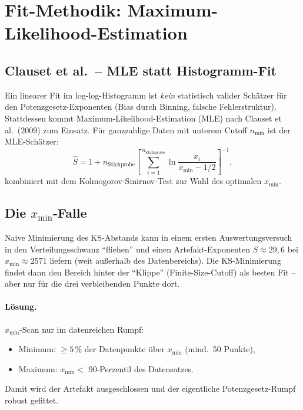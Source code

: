 \documentclass[11pt,a4paper]{article}
\begin{document}
\FloatBarrier
\section{Fit-Methodik: Maximum-Likelihood-Estimation}
\label{sec:powerlaw-method}

\subsection{Clauset et al.\ -- MLE statt Histogramm-Fit}

Ein linearer Fit im log-log-Histogramm ist \emph{kein} statistisch valider
Schätzer für den Potenzgesetz-Exponenten (Bias durch Binning, falsche
Fehlerstruktur). Stattdessen kommt Maximum-Likelihood-Estimation (MLE)
nach Clauset et al.\ (2009) zum Einsatz. Für ganzzahlige Daten mit unterem Cutoff $n_\text{min}$
ist der MLE-Schätzer:
\begin{equation}
\hat{S} = 1 + n_\text{Stichprobe}\left[\sum_{i=1}^{n_\text{Stichprobe}}
\ln\frac{x_i}{x_\text{min} - 1/2}\right]^{-1},
\label{eq:mle}
\end{equation}
kombiniert mit dem Kolmogorov-Smirnov-Test zur Wahl des optimalen $x_\text{min}$.

\subsection{Die $x_\text{min}$-Falle}
\label{sec:xmin-falle}

Naive Minimierung des KS-Abstands kann in einem ersten Auswertungsversuch in
den Verteilungsschwanz ``fliehen'' und einen Artefakt-Exponenten
$S \approx 29{,}6$ bei $x_\text{min} \approx 2571$ liefern (weit außerhalb
des Datenbereichs). Die KS-Minimierung findet dann den Bereich hinter der
``Klippe'' (Finite-Size-Cutoff) als besten Fit -- aber nur für die drei
verbleibenden Punkte dort.

\paragraph{Lösung.}
$x_\text{min}$-Scan nur im datenreichen Rumpf:
\begin{itemize}[itemsep=2pt]
\item Minimum: $\geq 5\,\%$ der Datenpunkte über $x_\text{min}$ (mind.\ 50 Punkte),
\item Maximum: $x_\text{min} < $ 90-Perzentil des Datensatzes.
\end{itemize}
Damit wird der Artefakt ausgeschlossen und der eigentliche Potenzgesetz-Rumpf
robust gefittet.
\end{document}

